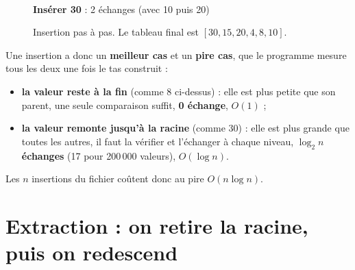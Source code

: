 \documentclass[11pt,a4paper]{article}
\begin{document}
\begin{figure}[H]
\begin{minipage}[t]{0.32\textwidth}
\\[2pt]
\small \textbf{Insérer 30} : 2 échanges (avec 10 puis 20)
\end{minipage}
\caption{Insertion pas à pas. Le tableau final est $[30, 15, 20, 4, 8, 10]$.}
\end{figure}

Une insertion a donc un \textbf{meilleur cas} et un \textbf{pire cas}, que le programme
mesure tous les deux une fois le tas construit :
\begin{itemize}
  \item \textbf{la valeur reste à la fin} (comme 8 ci-dessus) : elle est plus petite que
        son parent, une seule comparaison suffit, \textbf{0 échange}, $O(1)$ ;
  \item \textbf{la valeur remonte jusqu'à la racine} (comme 30) : elle est plus grande que
        toutes les autres, il faut la vérifier et l'échanger à chaque niveau,
        \textbf{$\log_2 n$ échanges} (17 pour 200\,000 valeurs), $O(\log n)$.
\end{itemize}
Les $n$ insertions du fichier coûtent donc au pire $O(n \log n)$.

\section{Extraction : on retire la racine, puis on redescend}
\end{document}
